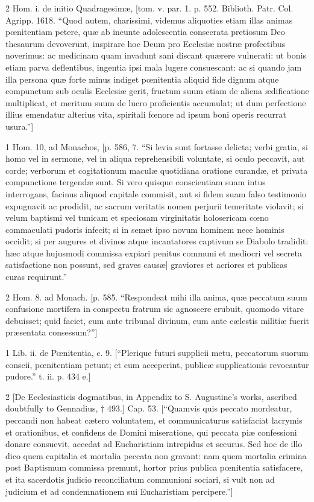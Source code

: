 2
Hom. i. de initio Quadragesimæ, [tom. v. par. 1. p. 552. Biblioth. Patr. Col. Agripp. 1618. “Quod autem, charissimi, videmus aliquoties etiam illas animas pœnitentiam petere, quæ ab ineunte adolescentia consecrata pretiosum Deo thesaurum devoverunt, inspirare hoc Deum pro Ecclesiæ nostræ profectibus noverimus: ac medicinam quam invadunt sani discant quærere vulnerati: ut bonis etiam parva deflentibus, ingentia ipsi mala lugere consuescant: ac si quando jam illa persona quæ forte minus indiget pœnitentia aliquid fide dignum atque compunctum sub oculis Ecclesiæ gerit, fructum suum etiam de aliena ædificatione multiplicat, et meritum suum de lucro proficientis accumulat; ut dum perfectione illius emendatur alterius vita, spiritali fœnore ad ipsum boni operis recurrat usura.”]

1
Hom. 10, ad Monachos, [p. 586, 7. “Si levia sunt fortasse delicta; verbi gratia, si homo vel in sermone, vel in aliqua reprehensibili voluntate, si oculo peccavit, aut corde; verborum et cogitationum maculæ quotidiana oratione curandæ, et privata compunctione tergendæ sunt. Si vero quisque conscientiam suam intus interrogans, facinus aliquod capitale commisit, aut si fidem suam falso testimonio expugnavit ac prodidit, ac sacrum veritatis nomen perjurii temeritate violavit; si velum baptismi vel tunicam et speciosam virginitatis holosericam cœno commaculati pudoris infecit; si in semet ipso novum hominem nece hominis occidit; si per augures et divinos atque incantatores captivum se Diabolo tradidit: hæc atque hujusmodi commissa expiari penitus communi et mediocri vel secreta satisfactione non possunt, sed graves causæ] graviores et acriores et publicas curas requirunt.”

2
Hom. 8. ad Monach. [p. 585. “Respondeat mihi illa anima, quæ peccatum suum confusione mortifera in conspectu fratrum sic agnoscere erubuit, quomodo vitare debuisset; quid faciet, cum ante tribunal divinum, cum ante cælestis militiæ fuerit præsentata consessum?”]

1
Lib. ii. de Pœnitentia, c. 9. [“Plerique futuri supplicii metu, peccatorum suorum conscii, pœnitentiam petunt; et cum acceperint, publicæ supplicationis revocantur pudore.” t. ii. p. 434 e.]

2
[De Ecclesiasticis dogmatibus, in Appendix to S. Augustine’s works, ascribed doubtfully to Gennadius, † 493.] Cap. 53. [“Quamvis quis peccato mordeatur, peccandi non habeat cætero voluntatem, et communicaturus satisfaciat lacrymis et orationibus, et confidens de Domini miseratione, qui peccata piæ confessioni donare consuevit, accedat ad Eucharistiam intrepidus et securus. Sed hoc de illo dico quem capitalia et mortalia peccata non gravant: nam quem mortalia crimina post Baptismum commissa premunt, hortor prius publica pœnitentia satisfacere, et ita sacerdotis judicio reconciliatum communioni sociari, si vult non ad judicium et ad condemnationem sui Eucharistiam percipere.”]

